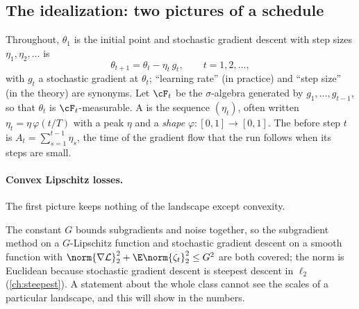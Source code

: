 \begin{refsection}
\section{The idealization: two pictures of a schedule}\label{sec:schedules:ideal}

Throughout, $\theta_1$ is the initial point and stochastic gradient descent with step sizes $\eta_1,\eta_2,\dots$ is
\begin{equation}\label{eq:schedules:sgd}
  \theta_{t+1}=\theta_t-\eta_t\,g_t ,\qquad t=1,2,\dots,
\end{equation}
with $g_t$ a stochastic gradient at $\theta_t$; ``learning rate'' (in practice) and ``step size'' (in the theory) are synonyms. Let $\cF_t$ be the $\sigma$-algebra generated by $g_1,\dots,g_{t-1}$, so that $\theta_t$ is $\cF_t$-measurable. A  is the sequence $(\eta_t)$, often written $\eta_t=\eta\,\varphi(t/T)$ with a peak $\eta$ and a \emph{shape} $\varphi\colon[0,1]\to[0,1]$. The  before step $t$ is $A_t=\sum_{s=1}^{t-1}\eta_s$, the time of the gradient flow that the run follows when its steps are small.

\paragraph{Convex Lipschitz losses.} The first picture keeps nothing of the landscape except convexity.


The constant $G$ bounds subgradients and noise together, so the subgradient method on a $G$-Lipschitz function and stochastic gradient descent on a smooth function with $\norm{\nabla\Loss}_2^2+\E\norm{\zeta_t}_2^2\le G^2$ are both covered; the norm is Euclidean because stochastic gradient descent is steepest descent in $\ell_2$ (\cref{ch:steepest}). A statement about the whole class cannot see the scales of a particular landscape, and this will show in the numbers.


\end{refsection}
